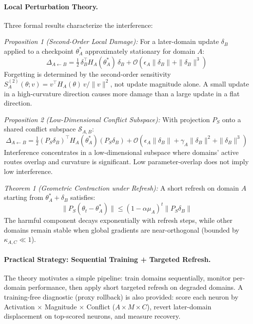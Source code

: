 \documentclass[11pt,a4paper]{article}
\begin{document}
\paragraph{Local Perturbation Theory.}
Three formal results characterize the interference:

\emph{Proposition 1 (Second-Order Local Damage):} For a later-domain update $\delta_B$ applied to a checkpoint $\theta_A^*$ approximately stationary for domain $A$:
\begin{equation}
\Delta_{A \leftarrow B} = \tfrac{1}{2}\,\delta_B^\top H_A(\theta_A^*)\,\delta_B + \mathcal{O}(\epsilon_A\|\delta_B\| + \|\delta_B\|^3)
\end{equation}
Forgetting is determined by the second-order sensitivity $S_A^{(2)}(\theta; v) = v^\top H_A(\theta)\,v / \|v\|^2$, not update magnitude alone. A small update in a high-curvature direction causes more damage than a large update in a flat direction.

\emph{Proposition 2 (Low-Dimensional Conflict Subspace):} With projection $P_S$ onto a shared conflict subspace $\mathcal{S}_{A,B}$:
\begin{equation}
\Delta_{A \leftarrow B} = \tfrac{1}{2}(P_S\delta_B)^\top H_A(\theta_A^*)(P_S\delta_B) + \mathcal{O}(\epsilon_A\|\delta_B\| + \gamma_A\|\delta_B\|^2 + \|\delta_B\|^3)
\end{equation}
Interference concentrates in a low-dimensional subspace where domains' active routes overlap and curvature is significant. Low parameter-overlap does not imply low interference.

\emph{Theorem 1 (Geometric Contraction under Refresh):} A short refresh on domain $A$ starting from $\theta_A^* + \delta_B$ satisfies:
\begin{equation}
\|P_S(\theta_t - \theta_A^*)\| \leq (1 - \alpha\mu_A)^t \|P_S\delta_B\|
\end{equation}
The harmful component decays exponentially with refresh steps, while other domains remain stable when global gradients are near-orthogonal (bounded by $\kappa_{A,C} \ll 1$).

\paragraph{Practical Strategy: Sequential Training + Targeted Refresh.}
The theory motivates a simple pipeline: train domains sequentially, monitor per-domain performance, then apply short targeted refresh on degraded domains. A training-free diagnostic (proxy rollback) is also provided: score each neuron by Activation $\times$ Magnitude $\times$ Conflict ($A \times M \times C$), revert later-domain displacement on top-scored neurons, and measure recovery.
\end{document}

